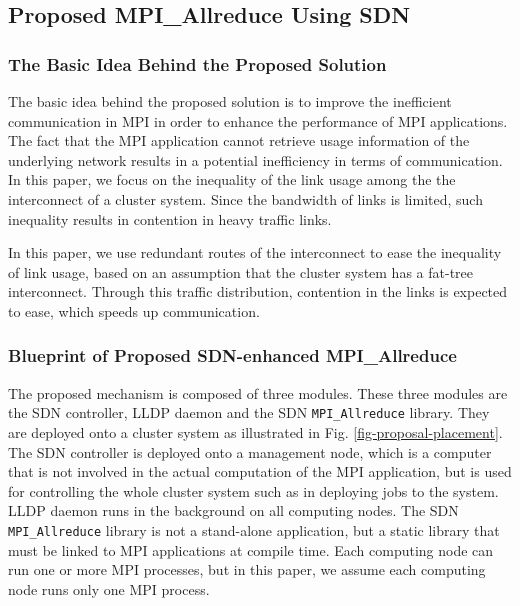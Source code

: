 \hypertarget{proposed-mpi_allreduce-using-sdn}{%
\subsection{Proposed MPI\_Allreduce Using
SDN}\label{proposed-mpi_allreduce-using-sdn}}

\hypertarget{the-basic-idea-behind-the-proposed-solution}{%
\subsubsection{The Basic Idea Behind the Proposed
Solution}\label{the-basic-idea-behind-the-proposed-solution}}

The basic idea behind the proposed solution is to improve the
inefficient communication in MPI in order to enhance the performance of
MPI applications. The fact that the MPI application cannot retrieve
usage information of the underlying network results in a potential
inefficiency in terms of communication. In this paper, we focus on the
inequality of the link usage among the the interconnect of a cluster
system. Since the bandwidth of links is limited, such inequality results
in contention in heavy traffic links.

In this paper, we use redundant routes of the interconnect to ease the
inequality of link usage, based on an assumption that the cluster system
has a fat-tree interconnect. Through this traffic distribution,
contention in the links is expected to ease, which speeds up
communication.

\hypertarget{blueprint-of-proposed-sdn-enhanced-mpi_allreduce}{%
\subsubsection{Blueprint of Proposed SDN-enhanced
MPI\_Allreduce}\label{blueprint-of-proposed-sdn-enhanced-mpi_allreduce}}

The proposed mechanism is composed of three modules. These three modules
are the SDN controller, LLDP daemon and the SDN \texttt{MPI\_Allreduce}
library. They are deployed onto a cluster system as illustrated in Fig.
\ref{fig-proposal-placement}. The SDN controller is deployed onto a
management node, which is a computer that is not involved in the actual
computation of the MPI application, but is used for controlling the
whole cluster system such as in deploying jobs to the system. LLDP
daemon runs in the background on all computing nodes. The SDN
\texttt{MPI\_Allreduce} library is not a stand-alone application, but a
static library that must be linked to MPI applications at compile time.
Each computing node can run one or more MPI processes, but in this
paper, we assume each computing node runs only one MPI process.


